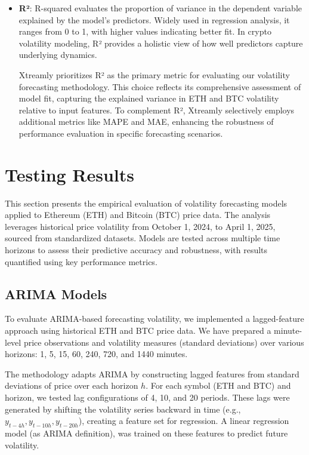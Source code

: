 \documentclass[9pt]{article}
\begin{document}
\begin{multicols}{2}
\begin{itemize}
			\item \textbf{R²}: R-squared evaluates the proportion of variance in the dependent variable explained by the model’s predictors. Widely used in regression analysis, it ranges from 0 to 1, with higher values indicating better fit. In crypto volatility modeling, R² provides a holistic view of how well predictors capture underlying dynamics.
			
			\smallskip
			Xtreamly prioritizes R² as the primary metric for evaluating our volatility forecasting methodology. This choice reflects its comprehensive assessment of model fit, capturing the explained variance in ETH and BTC volatility relative to input features. To complement R², Xtreamly selectively employs additional metrics like MAPE and MAE, enhancing the robustness of performance evaluation in specific forecasting scenarios.
		\end{itemize}
		
		\section{Testing Results}
		
		This section presents the empirical evaluation of volatility forecasting models applied to Ethereum (ETH) and Bitcoin (BTC) price data. The analysis leverages historical price volatility from October 1, 2024, to April 1, 2025, sourced from standardized datasets. Models are tested across multiple time horizons to assess their predictive accuracy and robustness, with results quantified using key performance metrics.
		
		\subsection{ARIMA Models}
		
		To evaluate ARIMA-based forecasting volatility, we implemented a lagged-feature approach using historical ETH and BTC price data. We have prepared a minute-level price observations and volatility measures (standard deviations) over various horizons: 1, 5, 15, 60, 240, 720, and 1440 minutes.
		
		\smallskip
		
		The methodology adapts ARIMA by constructing lagged features from standard deviations of price over each horizon \( h \). For each symbol (ETH and BTC) and horizon, we tested lag configurations of 4, 10, and 20 periods. These lags were generated by shifting the volatility series backward in time (e.g., \( y_{t-4h}, y_{t-10h}, y_{t-20h} \)), creating a feature set for regression. A linear regression model (as ARIMA definition), was trained on these features to predict future volatility.
		

\end{multicols}
\end{document}

